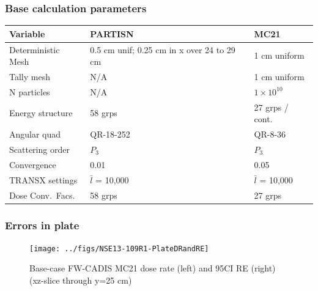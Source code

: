 \documentclass[xcolor=x11names,compress, handout]{beamer}
\renewcommand{\(}{\begin{columns}}
\renewcommand{\)}{\end{columns}}
\newcommand{\<}[1]{\begin{column}{#1}}
\renewcommand{\>}{\end{column}}
\begin{document}
\begin{frame}[fragile]
  \frametitle{Base calculation parameters}
  \begin{table}[p]
  \label{tab:calcParams}
  \begin{center}
    \begin{tabu}{| X | X | X |}\hline
      Variable & PARTISN & MC21\\\hline\hline
	Deterministic Mesh & 0.5 cm unif; 0.25 cm in x over 24 to 29 cm & 1 cm uniform \\\hline
	Tally mesh & N/A & 1 cm uniform \\\hline
	N particles & N/A & $1 \times 10^{10}$\\\hline
	Energy structure & 58 grps & 27 grps / cont.\\\hline
	Angular quad & QR-18-252 & QR-8-36\\\hline
	Scattering order & $P_3$ & $P_3$\\\hline
	Convergence & 0.01 & 0.05\\\hline
	TRANSX settings & $\bar{l}$ = 10,000 & $\bar{l}$ = 10,000\\\hline
	Dose Conv.\ Facs. & 58 grps & 27 grps \\\hline
    \end{tabu}
  \end{center}
\end{table}
  
\end{frame}


\begin{frame}[fragile]
  \frametitle{Errors in plate}
 \begin{figure}[p]
   \begin{center}
     \texttt{[image: ../figs/NSE13-109R1-PlateDRandRE]}
   \end{center}
   \caption{Base-case FW-CADIS MC21 dose rate (left) and 95CI RE (right) (xz-slice through y=25 cm)}
   \label{fig:Plate}
 \end{figure}
\end{frame}


\end{document}
